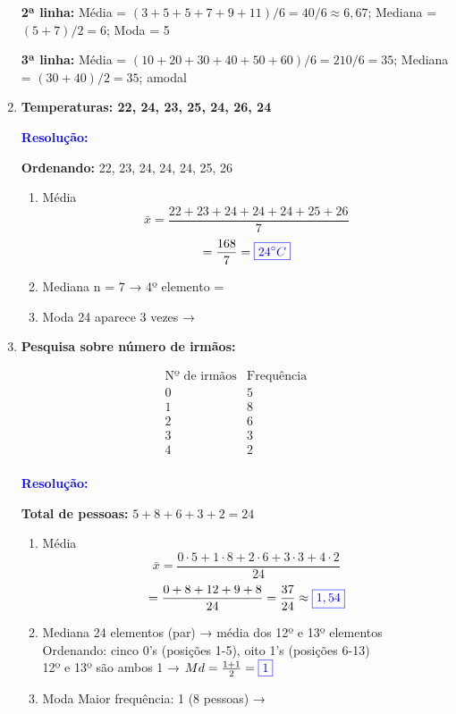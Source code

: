 \documentclass[11pt]{article}
\newcommand{\respostaNum}[1]{\textcolor{blue}{\boxed{#1}}}
\newcommand{\resolucao}{\textbf{\textcolor{blue}{Resolução:}}}
\begin{document}
\begin{multicols}{2}
\begin{enumerate}[leftmargin=*, start=7]
\textbf{2ª linha:} Média = $(3+5+5+7+9+11)/6 = 40/6 \approx 6,67$; Mediana = $(5+7)/2 = 6$; Moda = 5

\textbf{3ª linha:} Média = $(10+20+30+40+50+60)/6 = 210/6 = 35$; Mediana = $(30+40)/2 = 35$; amodal

\item \textbf{Temperaturas: 22, 24, 23, 25, 24, 26, 24}

\resolucao

\textbf{Ordenando:} 22, 23, 24, 24, 24, 25, 26

\begin{enumerate}[label=\alph*)]
\item Média
\[\bar{x} = \frac{22+23+24+24+24+25+26}{7} \] 
\[= \frac{168}{7} = \respostaNum{24^{\circ}C} \]

\item Mediana
n = 7 → 4º elemento = \respostaNum{24^{\circ}C}

\item Moda
24 aparece 3 vezes → \respostaNum{24^{\circ}C}
\end{enumerate}

\item \textbf{Pesquisa sobre número de irmãos:}

\[
\begin{array}{c|c}
\text{Nº de irmãos} & \text{Frequência} \\
\hline
0 & 5 \\
1 & 8 \\
2 & 6 \\
3 & 3 \\
4 & 2 \\
\end{array}
\]

\resolucao

\textbf{Total de pessoas:} $5+8+6+3+2 = 24$

\begin{enumerate}[label=\alph*)]
\item Média
\[\bar{x} = \frac{0\cdot5 + 1\cdot8 + 2\cdot6 + 3\cdot3 + 4\cdot2}{24} \]
\[= \frac{0+8+12+9+8}{24} = \frac{37}{24} \approx \respostaNum{1,54} \]

\item Mediana
24 elementos (par) → média dos 12º e 13º elementos \\
Ordenando: cinco 0's (posições 1-5), oito 1's (posições 6-13) \\
12º e 13º são ambos 1 → $Md = \frac{1+1}{2} = \respostaNum{1}$

\item Moda
Maior frequência: 1 (8 pessoas) → \respostaNum{1}
\end{enumerate}


\end{enumerate}
\end{multicols}
\end{document}
